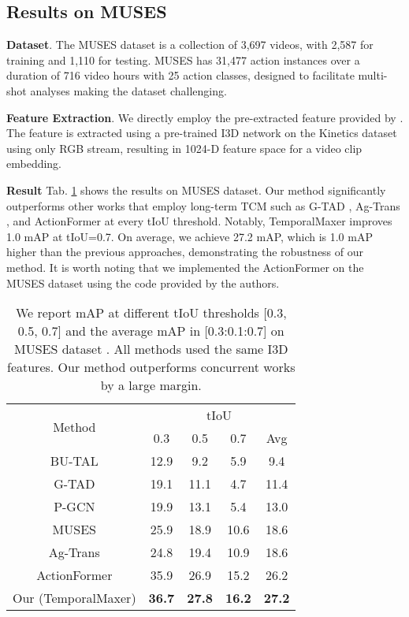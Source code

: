 \documentclass[10pt,twocolumn,letterpaper]{article}
\begin{document}
\subsection{Results on MUSES}
\textbf{Dataset}. The MUSES dataset \cite{liu2021multi} is a collection of 3,697 videos, with 2,587 for training and 1,110 for testing. MUSES has 31,477 action instances over a duration of 716 video hours with 25 action classes, designed to facilitate multi-shot analyses making the dataset challenging.

\textbf{Feature Extraction}. We directly employ the pre-extracted feature provided by \cite{liu2021multi}. The feature is extracted using a pre-trained I3D network\cite{carreira2017quo} on the Kinetics dataset \cite{kay2017kinetics} using only RGB stream, resulting in 1024-D feature space for a video clip embedding.

\textbf{Result}
Tab. \ref{table:sota_muses} shows the results on MUSES dataset. Our method significantly outperforms other works that employ long-term TCM such as G-TAD \cite{xu2020g}, Ag-Trans \cite{zhao2021actionness}, and ActionFormer \cite{zhang2022actionformer} at every tIoU threshold. Notably, TemporalMaxer improves 1.0 mAP at tIoU=0.7. On average, we achieve 27.2 mAP, which is 1.0 mAP higher than the previous approaches, demonstrating the robustness of our method. It is worth noting that we implemented the ActionFormer \cite{zhang2022actionformer} on the MUSES dataset using the code provided by the authors.

\begin{table}[]
\centering
\begin{tabular}{ccccc}
\hline
\multirow{2}{*}{Method}                   & \multicolumn{4}{c}{tIoU}                \\ \cline{2-5}
                                          & 0.3  & 0.5   & 0.7  & Avg  \\ \hline
BU-TAL \cite{zhao2020bottom}              & 12.9 & 9.2   & 5.9  & 9.4  \\
G-TAD \cite{xu2020g}                      & 19.1 & 11.1  & 4.7  & 11.4 \\
P-GCN \cite{zeng2019graph}                & 19.9 & 13.1  & 5.4  & 13.0 \\
MUSES \cite{liu2021multi}                 & 25.9 & 18.9 & 10.6 & 18.6 \\
Ag-Trans \cite{zhao2021actionness}        & 24.8 & 19.4 & 10.9 & 18.6 \\
ActionFormer \cite{zhang2022actionformer} & 35.9 & 26.9 & 15.2 & 26.2 \\ \hline
Our (TemporalMaxer)                       & \textbf{36.7} & \textbf{27.8} & \textbf{16.2} & \textbf{27.2} \\ \hline
\end{tabular}
\caption{We report mAP at different tIoU thresholds [0.3, 0.5, 0.7] and the average mAP in [0.3:0.1:0.7] on MUSES dataset \cite{liu2021multi}. All methods used the same I3D features. Our method outperforms concurrent works by a large margin.}
\label{table:sota_muses}
\end{table}
\end{document}
